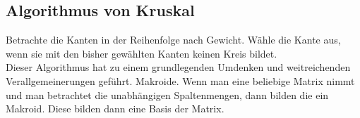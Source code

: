  \subsection{Algorithmus von Kruskal}
 Betrachte die Kanten in der Reihenfolge nach Gewicht. Wähle die Kante aus, wenn sie mit den bisher gewählten Kanten keinen Kreis bildet.\\
 
Dieser Algorithmus hat zu einem grundlegenden Umdenken und weitreichenden Verallgemeinerungen geführt. Makroide. Wenn man eine beliebige Matrix nimmt und man betrachtet die unabhängigen Spaltenmengen, dann bilden die ein Makroid. Diese bilden dann eine Basis der Matrix.\\